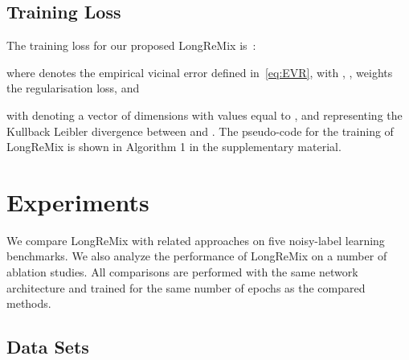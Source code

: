 \documentclass{article}
\begin{document}
\subsection{Training Loss}

The training loss for our proposed LongReMix is~\cite{li2020dividemix}:

where  denotes the empirical vicinal error defined in~\eqref{eq:EVR}, with
, ,  weights the regularisation loss, and

with  denoting a vector of  dimensions with values equal to , and 
 representing the Kullback Leibler divergence between  and .
The pseudo-code for the training of LongReMix is shown in Algorithm 1 in the supplementary material.



























\section{Experiments}\label{sec:experiments}


We compare LongReMix with related approaches on five noisy-label learning benchmarks. We also analyze the performance of LongReMix on a number of ablation studies. All comparisons are performed with the same network architecture and trained for the same number of epochs as the compared methods.

\subsection{Data Sets}
\label{sec:datasets}
\end{document}
